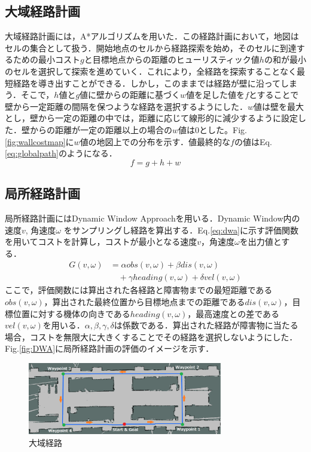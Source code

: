 \documentclass{jarticle}
\renewcommand{\%}{\textsf{\char`\%}}
\begin{document}
\subsection{大域経路計画}
大域経路計画には，A*アルゴリズムを用いた．この経路計画において，地図はセルの集合として扱う．開始地点のセルから経路探索を始め，そのセルに到達するための最小コスト$g$と目標地点からの距離のヒューリスティック値$h$の和が最小のセルを選択して探索を進めていく．これにより，全経路を探索することなく最短経路を導き出すことができる．しかし，このままでは経路が壁に沿ってしまう．そこで，$h$値と$g$値に壁からの距離に基づく$w$値を足した値を$f$とすることで壁から一定距離の間隔を保つような経路を選択するようにした．$w$値は壁を最大とし，壁から一定の距離の中では，距離に応じて線形的に減少するように設定した．壁からの距離が一定の距離以上の場合の$w$値は0とした。Fig.\ref{fig:wallcostmap}に$w$値の地図上での分布を示す．値最終的な$f$の値はEq.\ref{eq:globalpath}のようになる．
\vspace{-3mm}
\begin{equation}
	f = g + h + w
	\label{eq:globalpath}
\end{equation}
\subsection{局所経路計画} 
局所経路計画にはDynamic Window Approachを用いる．Dynamic Window内の速度$v$, 角速度$\omega$ をサンプリングし経路を算出する．Eq.\ref{eq:dwa}に示す評価関数を用いてコストを計算し，コストが最小となる速度$v$，角速度$\omega$を出力値とする．
\vspace{-3mm}
\begin{equation}
	\begin{split}
		G(v, \omega) &= \alpha obs(v, \omega) + \beta dis(v, \omega)\\
		&\quad+ \gamma heading(v, \omega) + \delta vel(v, \omega) 
	    \label{eq:dwa}
	\end{split}
\end{equation}
ここで，評価関数には算出された各経路と障害物までの最短距離である$obs(v,\omega)$，算出された最終位置から目標地点までの距離である$dis(v,\omega)$，目標位置に対する機体の向きである$heading(v,\omega)$，最高速度との差である$vel(v, \omega)$を用いる．$α,β,γ,δ$は係数である．算出された経路が障害物に当たる場合，コストを無限大に大きくすることでその経路を選択しないようにした．Fig.\ref{fig:DWA}に局所経路計画の評価のイメージを示す．
\begin{figure}
	\includegraphics[width=8.5cm]{./picture/global_path.png}
	\caption{大域経路}
	\label{fig:globalpath}
\end{figure}
\end{document}
